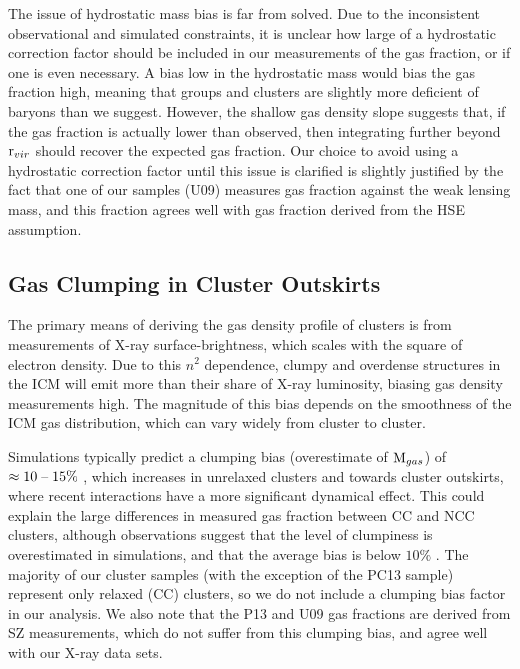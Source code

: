 The issue of hydrostatic mass bias is far from solved. Due to the
inconsistent observational and simulated constraints, it is unclear
how large of a hydrostatic correction factor should be included in our
measurements of the gas fraction, or if one is even necessary. A bias
low in the hydrostatic mass would bias the gas fraction high, meaning
that groups and clusters are slightly more deficient of baryons than
we suggest. However, the shallow gas density slope suggests that, if
the gas fraction is actually lower than observed, then integrating
further beyond $\textrm{r\ensuremath{_{vir}}}$ should recover the expected gas fraction. Our
choice to avoid using a hydrostatic correction factor until this issue
is clarified is slightly justified by the fact that one of our samples
(U09) measures gas fraction against the weak lensing mass, and this
fraction agrees well with gas fraction derived from the HSE
assumption.

\subsection{Gas Clumping in Cluster Outskirts}
\label{sec:Limitations.Clumping}

The primary means of deriving the gas density profile of clusters is
from measurements of X-ray surface-brightness, which scales with the
square of electron density. Due to this $n^2$ dependence, clumpy and
overdense structures in the ICM will emit more than their share of
X-ray luminosity, biasing gas density measurements high. The magnitude
of this bias depends on the smoothness of the ICM gas distribution,
which can vary widely from cluster to cluster.

Simulations typically predict a clumping bias (overestimate of
$\textrm{M}{}_{gas}$) of $\approx10\;\textrm{--}\;15\%$
\citep{Nagai2011,Battaglia2013}, which increases in unrelaxed clusters
and towards cluster outskirts, where recent interactions have a more
significant dynamical effect. This could explain the large differences
in measured gas fraction between CC and NCC clusters, although
observations suggest that the level of clumpiness is overestimated in
simulations, and that the average bias is below $10\%$
\citep{Eckert2013c}. The majority of our cluster samples (with the
exception of the PC13 sample) represent only relaxed (CC) clusters, so
we do not include a clumping bias factor in our analysis. We also note
that the P13 \citep{PlanckIntV} and U09 \citep{Umetsu2009} gas
fractions are derived from SZ measurements, which do not suffer from
this clumping bias, and agree well with our X-ray data sets.

